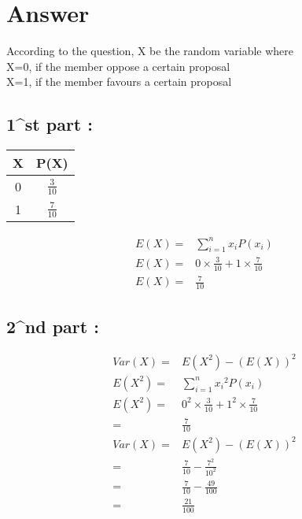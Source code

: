 \documentclass{beamer}
\begin{document}
\section{Answer}
\begin{frame}{}
According to the question, X be  the random variable where\\
X=0, if the member oppose a certain proposal\\
X=1, if the member favours a certain proposal\\
\subsection{1^{st} part :}
\begin{table}[]
    \centering
    \begin{tabular}{|c|c|}
        \hline
        X &P(X)  \\
        \hline\hline
        0 & $\frac{3}{10}$\\
        \hline
        1 & $\frac{7}{10} $\\
        \hline
    \end{tabular}
    

\end{table}

\begin{align}
E(X)=&\sum_{i=1}^{n}x_i P(x_i)\\
E(X)=&0\times \frac{3}{10}+1\times \frac{7}{10}\\
E(X)=&\frac{7}{10}
\end{align}
\end{frame}
\begin{frame}{}
\subsection{2^{nd} part :}

\begin{align}
Var(X)=&E(X^2)-(E(X))^2\\
E(X^2)=&\sum_{i=1}^{n}{x_i}^2 P(x_i)\\
E(X^2)=&{0}^2\times \frac{3}{10}+{1}^2\times \frac{7}{10}\\
=&\frac{7}{10}\\
Var(X)=&E({X}^2)-({E(X)})^2\\
=&\frac{7}{10}-\frac{{7}^2}{{10}^2}\\
=&\frac{7}{10}-\frac{49}{100}\\
=&\frac{21}{100}\\
\end{align}

\end{frame}
\end{document}
